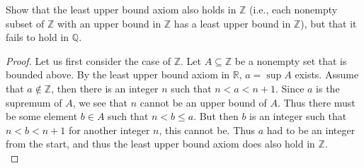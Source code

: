 \begin{exercise}{9}
    Show that the least upper bound axiom also holds in $\mathbb{Z}$ (i.e., each nonempty subset of $\mathbb{Z}$ with an upper bound in $\mathbb{Z}$ has a least upper bound in $\mathbb{Z}$), but that it fails to hold in $\mathbb{Q}$.
\end{exercise}
\begin{proof}
    Let us first consider the case of $\mathbb{Z}$. Let $A\subseteq \mathbb{Z}$ be a nonempty set that is bounded above. By the least upper bound axiom in $\mathbb{R}$, $a = \sup A$ exists. Assume that $a\notin \mathbb{Z}$, then there is an integer $n$ such that $n<a<n+1$. Since $a$ is the supremum of $A$, we see that $n$ cannot be an upper bound of $A$. Thus there must be some element $b\in A$ such that $n<b\leq a$. But then $b$ is an integer such that $n<b<n+1$ for another integer $n$, this cannot be. Thus $a$ had to be an integer from the start, and thus the least upper bound axiom does also hold in $\mathbb{Z}$.\\


\end{proof}
